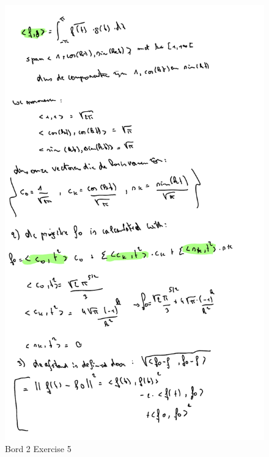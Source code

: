 \documentclass[a4paper]{report}
\begin{document}
\begin{figure}[H]
	\centering
	\includegraphics[width=\textwidth]{exercises/bord_2_ex_5_r.pdf}
	\caption{Bord 2 Exercise 5}
	\label{fig:bord_2_ex_5}
\end{figure}
\end{document}
